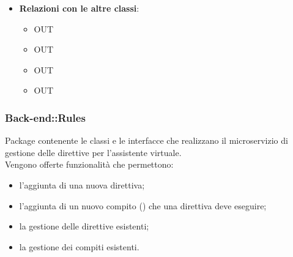 \begin{itemize}
\begin{itemize}
\begin{itemize}
		\end{itemize}
	\end{itemize}
	\item \textbf{Relazioni con le altre classi}:
	\begin{itemize}
		\item OUT \hyperlink{LambdaContext_label}{}
		\item OUT \hyperlink{LambdaEvent_label}{}
		\item OUT \hyperlink{NotificationChannel_label}{}
		\item OUT \hyperlink{NotificationMessage_label}{}
	\end{itemize}
\end{itemize}
\FloatBarrier

\subsubsection{Back-end::Rules}
Package contenente le classi e le interfacce che realizzano il microservizio di gestione delle direttive per l'assistente virtuale.\\
Vengono offerte funzionalità che permettono:
\begin{itemize}
	\item l'aggiunta di una nuova direttiva;
	\item l'aggiunta di un nuovo compito () che una direttiva deve eseguire;
	\item la gestione delle direttive esistenti;
	\item la gestione dei compiti esistenti.
\end{itemize}


